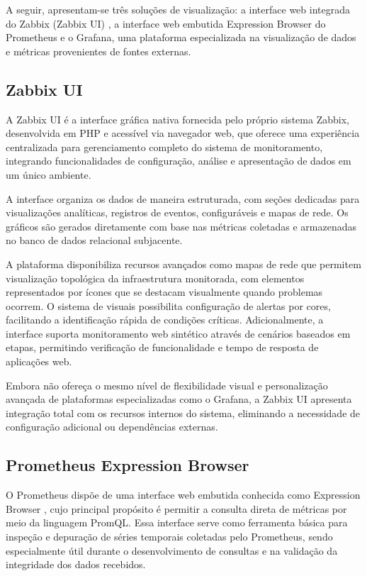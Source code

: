 A seguir, apresentam-se três soluções de visualização: a interface web integrada do Zabbix (Zabbix UI) , a interface web embutida Expression Browser do Prometheus e o Grafana, uma plataforma especializada na visualização de dados e métricas provenientes de fontes externas.

\subsection{Zabbix UI}
\label{subsection:ZabbixUI}

A Zabbix UI \citep{zabbix2025} é a interface gráfica nativa fornecida pelo próprio sistema Zabbix, desenvolvida em PHP e acessível via navegador web, que oferece uma experiência centralizada para gerenciamento completo do sistema de monitoramento, integrando funcionalidades de configuração, análise e apresentação de dados em um único ambiente.

A interface organiza os dados de maneira estruturada, com seções dedicadas para visualizações analíticas, registros de eventos,  configuráveis e mapas de rede. Os gráficos são gerados diretamente com base nas métricas coletadas e armazenadas no banco de dados relacional subjacente.

A plataforma disponibiliza recursos avançados como mapas de rede que permitem visualização topológica da infraestrutura monitorada, com elementos representados por ícones que se destacam visualmente quando problemas ocorrem. O sistema de  visuais possibilita configuração de alertas por cores, facilitando a identificação rápida de condições críticas. Adicionalmente, a interface suporta monitoramento web sintético através de cenários baseados em etapas, permitindo verificação de funcionalidade e tempo de resposta de aplicações web.

Embora não ofereça o mesmo nível de flexibilidade visual e personalização avan\-çada de plataformas especializadas como o Grafana, a Zabbix UI apresenta integração total com os recursos internos do sistema, eliminando a necessidade de configuração adicional ou dependências externas.

\subsection{Prometheus Expression Browser}
\label{subsection:PrometheusExpressionBrowser}

O Prometheus dispõe de uma interface web embutida conhecida como Expression Browser \citep{promexpbrwsr2025}, cujo principal propósito é permitir a consulta direta de métricas por meio da linguagem PromQL. Essa interface serve como ferramenta básica para inspeção e depuração de séries temporais coletadas pelo Prometheus, sendo especialmente útil durante o desenvolvimento de consultas e na validação da integridade dos dados recebidos.


